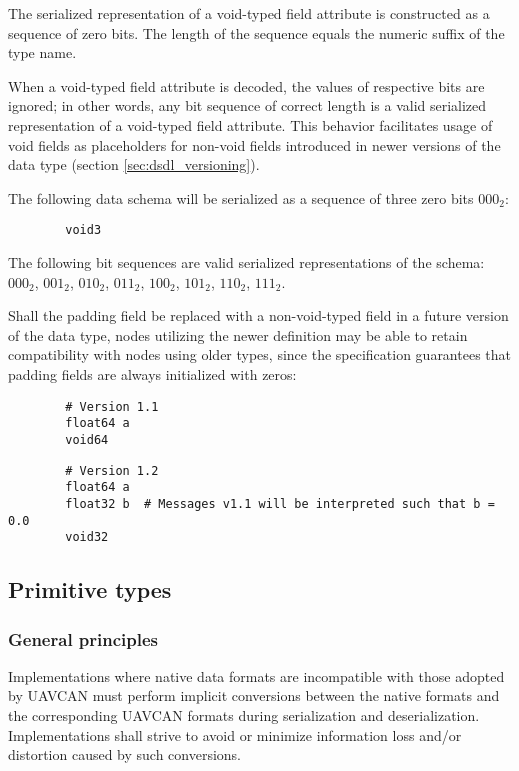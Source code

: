 The serialized representation of a void-typed field attribute is constructed as a sequence of zero bits.
The length of the sequence equals the numeric suffix of the type name.

When a void-typed field attribute is decoded, the values of respective bits are ignored;
in other words, any bit sequence of correct length is a valid serialized representation
of a void-typed field attribute.
This behavior facilitates usage of void fields as placeholders for non-void fields
introduced in newer versions of the data type (section \ref{sec:dsdl_versioning}).

\begin{remark}
    The following data schema will be serialized as a sequence of three zero bits $000_2$:
    \begin{verbatim}
        void3
    \end{verbatim}
    The following bit sequences are valid serialized representations of the schema:
    $000_2$,
    $001_2$,
    $010_2$,
    $011_2$,
    $100_2$,
    $101_2$,
    $110_2$,
    $111_2$.

    Shall the padding field be replaced with a non-void-typed field in a future version of the data type,
    nodes utilizing the newer definition may be able to retain compatibility with nodes using older types,
    since the specification guarantees that padding fields are always initialized with zeros:

    \begin{verbatim}
        # Version 1.1
        float64 a
        void64
    \end{verbatim}

    \begin{verbatim}
        # Version 1.2
        float64 a
        float32 b  # Messages v1.1 will be interpreted such that b = 0.0
        void32
    \end{verbatim}
\end{remark}

\subsection{Primitive types}

\subsubsection{General principles}

Implementations where native data formats are incompatible with those adopted by UAVCAN must perform
implicit conversions between the native formats and the corresponding UAVCAN formats during
serialization and deserialization.
Implementations shall strive to avoid or minimize information loss and/or distortion caused by such conversions.

